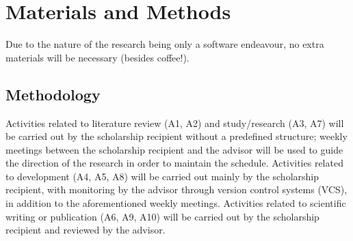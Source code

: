 \chapter{Materials and Methods}

Due to the nature of the research being only a software endeavour, no
extra materials will be necessary (besides coffee!).

\section{Methodology}

Activities related to literature review (A1, A2) and study/research (A3, A7)
will be carried out by the scholarship recipient without a predefined structure; weekly meetings between the scholarship recipient
and the advisor will be used to guide the direction of the research in order to maintain the schedule.
Activities related to development (A4, A5, A8) will be carried out mainly by the
scholarship recipient, with monitoring by the advisor through version control systems (VCS),
in addition to the aforementioned weekly meetings. Activities
related to scientific writing or publication (A6, A9, A10) will be carried out by the scholarship recipient and reviewed
by the advisor.



